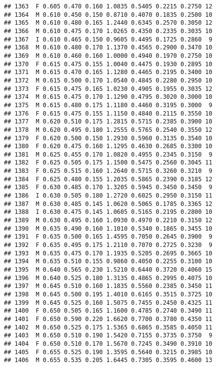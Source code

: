 \documentclass[
]{article}
\begin{document}
\begin{verbatim}
## 1363  F 0.605 0.470 0.160 1.0835 0.5405 0.2215 0.2750 12
## 1364  M 0.610 0.450 0.150 0.8710 0.4070 0.1835 0.2500 10
## 1365  M 0.610 0.480 0.165 1.2440 0.6345 0.2570 0.3050 12
## 1366  M 0.610 0.475 0.170 1.0265 0.4350 0.2335 0.3035 10
## 1367  I 0.610 0.465 0.150 0.9605 0.4495 0.1725 0.2860  9
## 1368  M 0.610 0.480 0.170 1.1370 0.4565 0.2900 0.3470 10
## 1369  M 0.610 0.460 0.160 1.0000 0.4940 0.1970 0.2750 10
## 1370  F 0.615 0.475 0.155 1.0040 0.4475 0.1930 0.2895 10
## 1371  M 0.615 0.470 0.165 1.1280 0.4465 0.2195 0.3400 10
## 1372  M 0.615 0.500 0.170 1.0540 0.4845 0.2280 0.2950 10
## 1373  F 0.615 0.475 0.165 1.0230 0.4905 0.1955 0.3035 12
## 1374  M 0.615 0.475 0.170 1.1290 0.4795 0.3020 0.3000 10
## 1375  M 0.615 0.480 0.175 1.1180 0.4460 0.3195 0.3000  9
## 1376  F 0.615 0.475 0.155 1.1150 0.4840 0.2115 0.3550 10
## 1377  M 0.620 0.510 0.175 1.2815 0.5715 0.2385 0.3900 10
## 1378  M 0.620 0.495 0.180 1.2555 0.5765 0.2540 0.3550 12
## 1379  F 0.620 0.500 0.150 1.2930 0.5960 0.3135 0.3540 10
## 1380  F 0.620 0.475 0.160 1.1295 0.4630 0.2685 0.3300 10
## 1381  M 0.625 0.455 0.170 1.0820 0.4955 0.2345 0.3150  9
## 1382  F 0.625 0.505 0.175 1.1500 0.5475 0.2560 0.3045 11
## 1383  F 0.625 0.515 0.160 1.2640 0.5715 0.3260 0.3210  9
## 1384  F 0.625 0.480 0.155 1.2035 0.5865 0.2390 0.3185 12
## 1385  F 0.630 0.485 0.170 1.3205 0.5945 0.3450 0.3450  9
## 1386  I 0.630 0.505 0.180 1.2720 0.6025 0.2950 0.3150 11
## 1387  M 0.630 0.485 0.145 1.0620 0.5065 0.1785 0.3365 12
## 1388  I 0.630 0.475 0.145 1.0605 0.5165 0.2195 0.2800 10
## 1389  M 0.630 0.495 0.160 1.0930 0.4970 0.2210 0.3150 12
## 1390  M 0.635 0.490 0.160 1.1010 0.5340 0.1865 0.3455 10
## 1391  F 0.635 0.500 0.165 1.4595 0.7050 0.2645 0.3900  9
## 1392  F 0.635 0.495 0.175 1.2110 0.7070 0.2725 0.3230  9
## 1393  M 0.635 0.475 0.170 1.1935 0.5205 0.2695 0.3665 10
## 1394  M 0.635 0.510 0.155 0.9860 0.4050 0.2255 0.3100 10
## 1395  M 0.640 0.565 0.230 1.5210 0.6440 0.3720 0.4060 15
## 1396  M 0.640 0.525 0.180 1.3135 0.4865 0.2995 0.4075 10
## 1397  M 0.645 0.510 0.160 1.1835 0.5560 0.2385 0.3450 11
## 1398  M 0.645 0.500 0.195 1.4010 0.6165 0.3515 0.3725 10
## 1399  M 0.645 0.525 0.160 1.5075 0.7455 0.2450 0.4325 11
## 1400  F 0.650 0.505 0.165 1.1600 0.4785 0.2740 0.3490 11
## 1401  F 0.650 0.590 0.220 1.6620 0.7700 0.3780 0.4350 11
## 1402  M 0.650 0.525 0.175 1.5365 0.6865 0.3585 0.4050 11
## 1403  M 0.650 0.510 0.190 1.5420 0.7155 0.3735 0.3750  9
## 1404  F 0.650 0.510 0.170 1.5670 0.7245 0.3490 0.3910 10
## 1405  F 0.655 0.525 0.190 1.3595 0.5640 0.3215 0.3985 10
## 1406  M 0.655 0.535 0.205 1.6445 0.7305 0.3595 0.4600 13

\end{verbatim}
\end{document}
